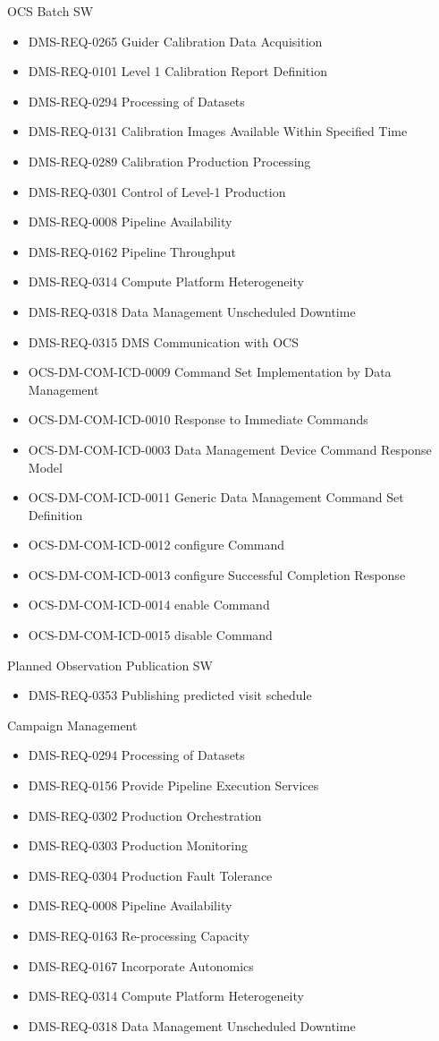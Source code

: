 OCS Batch SW \begin{itemize}
\item DMS-REQ-0265 Guider Calibration Data Acquisition
\item DMS-REQ-0101 Level 1 Calibration Report Definition
\item DMS-REQ-0294 Processing of Datasets
\item DMS-REQ-0131 Calibration Images Available Within Specified Time
\item DMS-REQ-0289 Calibration Production Processing
\item DMS-REQ-0301 Control of Level-1 Production
\item DMS-REQ-0008 Pipeline Availability
\item DMS-REQ-0162 Pipeline Throughput
\item DMS-REQ-0314 Compute Platform Heterogeneity
\item DMS-REQ-0318 Data Management Unscheduled Downtime
\item DMS-REQ-0315 DMS Communication with OCS
\item OCS-DM-COM-ICD-0009 Command Set Implementation by Data Management
\item OCS-DM-COM-ICD-0010 Response to Immediate Commands
\item OCS-DM-COM-ICD-0003 Data Management Device Command Response Model
\item OCS-DM-COM-ICD-0011 Generic Data Management Command Set Definition
\item OCS-DM-COM-ICD-0012 configure Command
\item OCS-DM-COM-ICD-0013 configure Successful Completion Response
\item OCS-DM-COM-ICD-0014 enable Command
\item OCS-DM-COM-ICD-0015 disable Command
\end{itemize}
Planned Observation Publication SW \begin{itemize}
\item DMS-REQ-0353 Publishing predicted visit schedule
\end{itemize}
Campaign Management \begin{itemize}
\item DMS-REQ-0294 Processing of Datasets
\item DMS-REQ-0156 Provide Pipeline Execution Services
\item DMS-REQ-0302 Production Orchestration
\item DMS-REQ-0303 Production Monitoring
\item DMS-REQ-0304 Production Fault Tolerance
\item DMS-REQ-0008 Pipeline Availability
\item DMS-REQ-0163 Re-processing Capacity
\item DMS-REQ-0167 Incorporate Autonomics
\item DMS-REQ-0314 Compute Platform Heterogeneity
\item DMS-REQ-0318 Data Management Unscheduled Downtime
\end{itemize}
